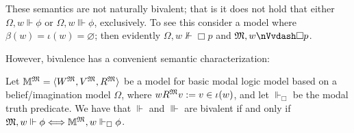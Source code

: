 These semantics are not naturally bivalent; that is it does not hold that
either $\Omega, w \Vdash \phi$ or $\Omega, w \Vvdash \phi$, exclusively. To
see this consider a model where $\beta (w) = \iota (w) = \varnothing$; then
evidently $\Omega, w {\nVdash} \Box p$ and $\Omega, w {\nVvdash} \Box p$.

However, bivalence has a convenient semantic characterization:

\begin{proposition}
  \label{biv1}Let $\mathbbm{M}^{\Omega} = \langle W^{\Omega}, V^{\Omega},
  R^{\Omega} \rangle$ be a model for basic modal logic model based on a
  belief/imagination model $\Omega$, where $w R^{\Omega} v \assign v \in \iota
  (w)$, and let $\Vdash_{\Box}$ be the modal truth predicate.   We have that
  $\Vdash$ and $\Vvdash$ are bivalent if and only if $\Omega, w \Vdash \phi
  \Longleftrightarrow \mathbbm{M}^{\Omega}, w \Vdash_{\Box} \phi$.
\end{proposition}

